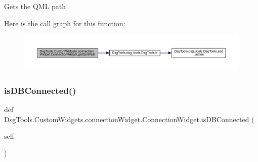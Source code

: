 \begin{DoxyVerb}Gets the QML path
\end{DoxyVerb}
 Here is the call graph for this function\+:
\nopagebreak
\begin{figure}[H]
\begin{center}
\leavevmode
\includegraphics[width=350pt]{class_dsg_tools_1_1_custom_widgets_1_1connection_widget_1_1_connection_widget_a265c92cef40ed91119a1b831141acb11_cgraph}
\end{center}
\end{figure}
\mbox{\label{class_dsg_tools_1_1_custom_widgets_1_1connection_widget_1_1_connection_widget_a4f15ad54d84acb8cd9dc06906e54a8d1}} 
\subsubsection{\texorpdfstring{is\+D\+B\+Connected()}{isDBConnected()}}
{\footnotesize\ttfamily def Dsg\+Tools.\+Custom\+Widgets.\+connection\+Widget.\+Connection\+Widget.\+is\+D\+B\+Connected (\begin{DoxyParamCaption}\item[{}]{self }\end{DoxyParamCaption})}

